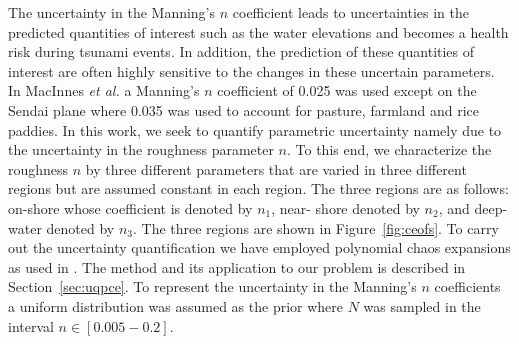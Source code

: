 The uncertainty in the Manning's $n$ coefficient leads to uncertainties in the
predicted quantities of interest such as the water elevations and becomes a
health risk during tsunami events. In addition,  the prediction of these
quantities of interest are often highly sensitive to  the changes in these
uncertain parameters.  In MacInnes \emph{et al.} a Manning's $n$ coefficient of 0.025
was used except on the Sendai plane where 0.035 was used to account for pasture,
farmland and rice paddies.  In this work, we seek to quantify parametric
uncertainty namely due to the uncertainty in the roughness parameter $n$. To
this end, we characterize the roughness $n$ by three different parameters that
are varied in three different regions but are assumed constant in each region.
The three regions are as follows:  on-shore whose coefficient is denoted by
$n_1$, near- shore  denoted by $n_2$, and deep-water denoted by $n_3$. The three
regions are shown in Figure~\ref{fig:ceofs}. To carry out the uncertainty
quantification we have employed polynomial chaos expansions as used in
\cite{sraj:2013a,sraj:2013b}.  The method and its application to our problem is
described in Section~\ref{sec:uqpce}.  To represent the uncertainty in the
Manning's $n$ coefficients a uniform distribution was assumed as the prior where
$N$ was sampled in the interval $n \in [0.005-0.2]$.
